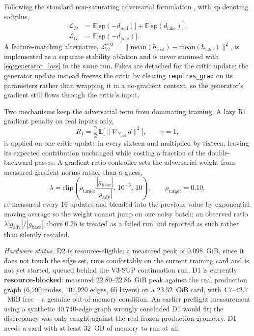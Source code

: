 \documentclass[10pt,a4paper]{article}
\begin{document}
Following the standard non-saturating adversarial formulation \cite{gan}, with $\mathrm{sp}$ denoting softplus,
\begin{align}
\mathcal{L}_D &= \mathbb{E}\big[\mathrm{sp}(-d_{\mathrm{real}})\big] + \mathbb{E}\big[\mathrm{sp}(d_{\mathrm{fake}})\big], \label{eq:critic_loss}\\
\mathcal{L}_G &= \mathbb{E}\big[\mathrm{sp}(-d_{\mathrm{fake}})\big]. \label{eq:generator_loss}
\end{align}
A feature-matching alternative, $\mathcal{L}_G^{\mathrm{FM}} = \lVert \mathrm{mean}(h_{\mathrm{real}}) - \mathrm{mean}(h_{\mathrm{fake}}) \rVert^2$, is implemented as a separate stability ablation and is never summed with \cref{eq:generator_loss} in the same run. Fakes are detached for the critic update; the generator update instead freezes the critic by clearing \texttt{requires\_grad} on its parameters rather than wrapping it in a no-gradient context, so the generator's gradient still flows through the critic's input.

Two mechanisms keep the adversarial term from dominating training. A lazy R1 gradient penalty \cite{r1_regularization} on real inputs only,
\begin{equation}
R_1 = \frac{\gamma}{2}\, \mathbb{E}\big[\lVert \nabla_{Y_{\mathrm{real}}}\, d \rVert^2\big], \qquad \gamma = 1,
\label{eq:r1}
\end{equation}
is applied on one critic update in every sixteen and multiplied by sixteen, leaving its expected contribution unchanged while costing a fraction of the double-backward passes. A gradient-ratio controller sets the adversarial weight from measured gradient norms rather than a guess,
\begin{equation}
\lambda = \mathrm{clip}\!\left(\rho_{\mathrm{target}} \frac{|g_{\mathrm{base}}|}{|g_{\mathrm{adv}}|},\, 10^{-5},\, 10\right), \qquad \rho_{\mathrm{target}} = 0.10,
\label{eq:gradratio}
\end{equation}
re-measured every 16 updates and blended into the previous value by exponential moving average so the weight cannot jump on one noisy batch; an observed ratio $\lambda |g_{\mathrm{adv}}|/|g_{\mathrm{base}}|$ above $0.25$ is treated as a failed run and reported as such rather than silently rescaled.

\emph{Hardware status.} D2 is resource-eligible: a measured peak of $0.098$~GiB, since it does not touch the edge set, runs comfortably on the current training card and is not yet started, queued behind the V3-SUP continuation run. D1 is currently \textbf{resource-blocked}: measured $22.80$--$22.86$~GiB peak against the real production graph (6,790 nodes, 107,920 edges, 65 layers) on a $23.52$~GiB card, with $4.7$--$42.7$~MiB free -- a genuine out-of-memory condition. An earlier preflight measurement using a synthetic 40,740-edge graph wrongly concluded D1 would fit; the discrepancy was only caught against the real frozen production geometry. D1 needs a card with at least $32$~GB of memory to run at all.
\end{document}

